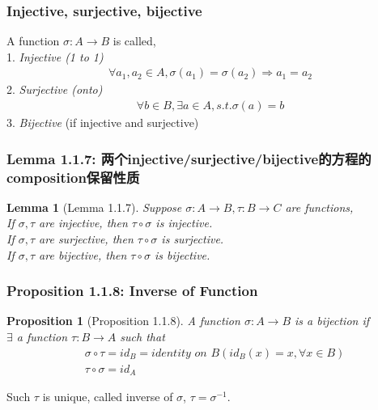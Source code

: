 \documentclass[11pt,a4paper]{article}
\newtheorem{proposition}{Proposition}
\newtheorem{lemma}{Lemma}
\begin{document}
\subsubsection{Injective, surjective, bijective}
A function $\sigma:A \rightarrow B$ is called,\\
1. \textit{Injective (1 to 1)}
\begin{equation}
    \begin{aligned}
        \forall a_1,a_2\in A, \sigma(a_1)=\sigma(a_2)\Rightarrow a_1=a_2
    \end{aligned}
    \nonumber
\end{equation}
2. \textit{Surjective (onto)}
\begin{equation}
    \begin{aligned}
        \forall b\in B,\exists a\in A, s.t. \sigma(a)=b
    \end{aligned}
    \nonumber
\end{equation}
3. \textit{Bijective} (if injective and surjective)

\subsubsection{Lemma 1.1.7: 两个injective/surjective/bijective的方程的composition保留性质}
\begin{lemma}[Lemma 1.1.7]
    Suppose $\sigma:A \rightarrow B, \tau: B \rightarrow C$ are functions,\\
    If $\sigma, \tau$ are injective, then $\tau\circ\sigma$ is \textit{injective}.\\
    If $\sigma, \tau$ are surjective, then $\tau\circ\sigma$ is \textit{surjective}.\\
    If $\sigma, \tau$ are bijective, then $\tau\circ\sigma$ is \textit{bijective}.\\
\end{lemma}

\subsubsection{Proposition 1.1.8: Inverse of Function}
\begin{proposition}[Proposition 1.1.8]
    A function $\sigma:A \rightarrow B$ is a bijection if\\
    $\exists$ a function $\tau:B \rightarrow A $ such that
    \begin{equation}
        \begin{aligned}
            &\sigma\circ\tau=id_B=\textit{identity on }B(id_B(x)=x, \forall x\in B)\\
            &\tau\circ\sigma=id_A
        \end{aligned}
        \nonumber
    \end{equation}
\end{proposition}
Such $\tau$ is unique, called inverse of $\sigma$, $\tau=\sigma^{-1}$.
\end{document}
